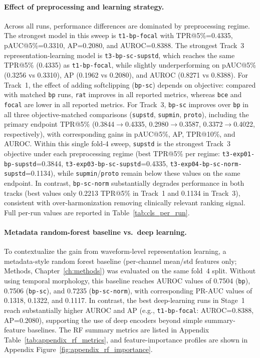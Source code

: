 \paragraph{Effect of preprocessing and learning strategy.}
Across all runs, performance differences are dominated by preprocessing regime.
The strongest model in this sweep is \texttt{t1-bp-focal} with TPR@5\%=0.4335, pAUC@5\%=0.3310, AP=0.2080, and AUROC=0.8388.
The strongest Track~3 representation-learning model is \texttt{t3-bp-sc-supstd}, which reaches the same TPR@5\% (0.4335) as \texttt{t1-bp-focal}, while slightly underperforming on pAUC@5\% (0.3256 vs 0.3310), AP (0.1962 vs 0.2080), and AUROC (0.8271 vs 0.8388).
For Track~1, the effect of adding softclipping (\texttt{bp-sc}) depends on objective: compared with matched \texttt{bp} runs, \texttt{rat} improves in all reported metrics, whereas \texttt{bce} and \texttt{focal} are lower in all reported metrics.
For Track~3, \texttt{bp-sc} improves over \texttt{bp} in all three objective-matched comparisons (\texttt{supstd}, \texttt{supmin}, \texttt{proto}), including the primary endpoint TPR@5\% (0.3844$\rightarrow$0.4335, 0.2980$\rightarrow$0.3587, 0.3372$\rightarrow$0.4022, respectively), with corresponding gains in pAUC@5\%, AP, TPR@10\%, and AUROC.
Within this single fold-4 sweep, \texttt{supstd} is the strongest Track~3 objective under each preprocessing regime (best TPR@5\% per regime: \texttt{t3-exp01-bp-supstd}=0.3844, \texttt{t3-exp03-bp-sc-supstd}=0.4335, \texttt{t3-exp04-bp-sc-norm-supstd}=0.1134), while \texttt{supmin}/\texttt{proto} remain below these values on the same endpoint.
In contrast, \texttt{bp-sc-norm} substantially degrades performance in both tracks (best values only 0.2213 TPR@5\% in Track~1 and 0.1134 in Track~3), consistent with over-harmonization removing clinically relevant ranking signal.
Full per-run values are reported in Table~\ref{tab:cls_per_run}.



\paragraph{Metadata random-forest baseline vs.\ deep learning.}
To contextualize the gain from waveform-level representation learning, a metadata-style random forest baseline (per-channel mean/std features only; Methods, Chapter~\ref{ch:methods}) was evaluated on the same fold~4 split.
Without using temporal morphology, this baseline reaches AUROC values of 0.7504 (\texttt{bp}), 0.7506 (\texttt{bp-sc}), and 0.7235 (\texttt{bp-sc-norm}), with corresponding PR-AUC values of 0.1318, 0.1322, and 0.1117.
In contrast, the best deep-learning runs in Stage~1 reach substantially higher AUROC and AP (e.g., \texttt{t1-bp-focal}: AUROC=0.8388, AP=0.2080), supporting the use of deep encoders beyond simple summary-feature baselines.
The RF summary metrics are listed in Appendix Table~\ref{tab:appendix_rf_metrics}, and feature-importance profiles are shown in Appendix Figure~\ref{fig:appendix_rf_importance}.

